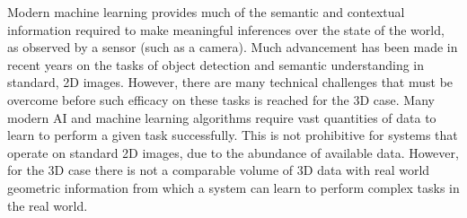 Modern machine learning provides much of the semantic and contextual information required to make meaningful inferences 
over the state of the world, as observed by a sensor (such as a camera). Much advancement 
has been made in recent years on the tasks of object detection and semantic understanding in standard, 2D images. However, 
there are many technical challenges that must be overcome before such efficacy on these tasks is reached for the 3D 
case. Many modern AI and machine learning algorithms require vast quantities of data to learn to perform a given task 
successfully. This is not prohibitive for systems that operate on standard 2D images, due to the abundance of available data. 
However, for the 3D case there is not a comparable volume of 3D data with real world geometric information from which a system 
can learn to perform complex tasks in the real world.